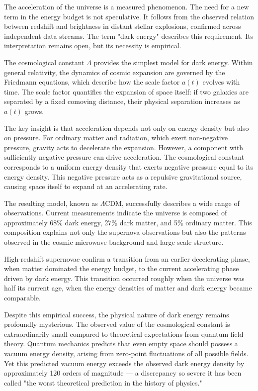 The acceleration of the universe is a measured phenomenon. The need for a new term in the energy budget is not speculative. It follows from the observed relation between redshift and brightness in distant stellar explosions, confirmed across independent data streams. The term "dark energy" describes this requirement. Its interpretation remains open, but its necessity is empirical.

The cosmological constant $\Lambda$ provides the simplest model for dark energy. Within general relativity, the dynamics of cosmic expansion are governed by the Friedmann equations, which describe how the scale factor $a(t)$ evolves with time. The scale factor quantifies the expansion of space itself: if two galaxies are separated by a fixed comoving distance, their physical separation increases as $a(t)$ grows.

The key insight is that acceleration depends not only on energy density but also on pressure. For ordinary matter and radiation, which exert non-negative pressure, gravity acts to decelerate the expansion. However, a component with sufficiently negative pressure can drive acceleration. The cosmological constant corresponds to a uniform energy density that exerts negative pressure equal to its energy density. This negative pressure acts as a repulsive gravitational source, causing space itself to expand at an accelerating rate.

The resulting model, known as $\Lambda$CDM, successfully describes a wide range of observations. Current measurements indicate the universe is composed of approximately 68\% dark energy, 27\% dark matter, and 5\% ordinary matter. This composition explains not only the supernova observations but also the patterns observed in the cosmic microwave background and large-scale structure.

High-redshift supernovae confirm a transition from an earlier decelerating phase, when matter dominated the energy budget, to the current accelerating phase driven by dark energy. This transition occurred roughly when the universe was half its current age, when the energy densities of matter and dark energy became comparable.

Despite this empirical success, the physical nature of dark energy remains profoundly mysterious. The observed value of the cosmological constant is extraordinarily small compared to theoretical expectations from quantum field theory. Quantum mechanics predicts that even empty space should possess a vacuum energy density, arising from zero-point fluctuations of all possible fields. Yet this predicted vacuum energy exceeds the observed dark energy density by approximately 120 orders of magnitude — a discrepancy so severe it has been called "the worst theoretical prediction in the history of physics."

